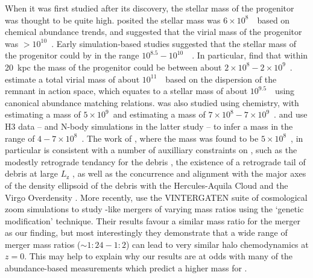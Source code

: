 When it was first studied after its discovery, the stellar mass of the \gse progenitor was thought to be quite high. \textcite{helmi18} posited the stellar mass was $6\times10^{8}$~\Msun\ based on chemical abundance trends, and \textcite{belokurov18} suggested that the virial mass of the progenitor was $> 10^{10}$~\Msun. Early simulation-based studies suggested that the stellar mass of the progenitor could by in the range $10^{8.5}-10^{10}$~\Msun\ \parencite{fattahi19,mackereth19a}.  In particular, \textcite{fattahi19} find that within 20~kpc the mass of the progenitor could be between about $2\times10^{8} - 2\times10^{9}$~\Msun. \textcite{das20} estimate a total virial mass of about $10^{11}$~\Msun\ based on the dispersion of the remnant in action space, which equates to a stellar mass of about $10^{9.5}$~\Msun\ using canonical abundance matching relations. \gse was also studied using chemistry, with \textcite{vincenzo19} estimating a mass of $5\times10^{9}$\Msun\ and \textcite{feuillet20} estimating a mass of $7\times10^{8} - 7\times10^{9}$~\Msun. \textcite{naidu20} and \textcite{naidu21} use H3 data -- and N-body simulations in the latter study -- to infer a mass in the range of $4-7\times10^{8}$~\Msun. The work of \textcite{naidu21}, where the mass was found to be $5\times10^{8}$~\Msun, in particular is consistent with a number of auxilliary constraints on \gse, such as the modestly retrograde tendancy for the debris \parencite{belokurov18,helmi18}, the existence of a retrograde tail of debris at large $L_\mathrm{z}$ \parencite{helmi18,naidu20}, as well as the concurrence and alignment with the major axes of the density ellipsoid of the debris with the Hercules-Aquila Cloud and the Virgo Overdensity \parencite[first noted by][]{simion19}. More recently, \textcite{rey23} use the VINTERGATEN suite of cosmological zoom simulations to study \gse-like mergers of varying mass ratios using the `genetic modification' technique. Their results favour a similar mass ratio for the \gse merger as our finding, but most interestingly they demonstrate that a wide range of merger mass ratios ($\sim 1:24 - 1:2$) can lead to very similar halo chemodynamics at $z=0$. This may help to explain why our results are at odds with many of the abundance-based measurements which predict a higher mass for \gse.

